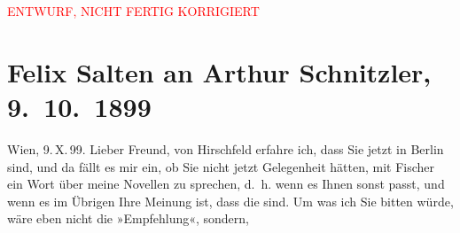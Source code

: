 
\begin{center}
            \textcolor{red}{ENTWURF, NICHT FERTIG KORRIGIERT}
                      \end{center}
            
         
         \renewcommand{\erwaehntePersonen}{Personen: Samuel Fischer, Georg Hirschfeld}
         \renewcommand{\erwaehnteInstitutionen}{Institutionen: S. Fischer Verlag, Volkstheater}
         \renewcommand{\erwaehnteOrte}{Orte: Berlin, Wien}
         \renewcommand{\erwaehnteWerke}{Werke: Der Hinterbliebene. Kurze Novellen, Schöne Seelen. Komödie in einem Akt}
               \section[Felix Salten an Arthur Schnitzler, 9. 10. 1899]{ Felix Salten an Arthur Schnitzler, 9. 10. 1899}\nopagebreak{}\rehead{ }\begin{ledgroupsized}[t]{13cm}\normalsize\beginnumbering \toendnotes[C]{\smallbreak\pagebreak[2]} 
\toendnotes[C]{\smallbreak}\pstart
           \raggedleft{}{\pb}Wien, 9. X. 99. \pend
           \pstart
           Lieber Freund, von Hirschfeld
               erfahre ich, dass Sie jetzt in Berlin sind, und
               da fällt es mir ein, ob Sie nicht jetzt Gelegenheit hätten, mit Fischer ein Wort über meine Novellen zu sprechen, d. h. wenn es Ihnen sonst passt, und
               wenn es im Übrigen Ihre Meinung ist, dass die \label{K_L03301-1v}\label{K_L03301-1h} sind. Um was ich Sie bitten würde, wäre eben nicht die »Empfehlung«, sondern,

\end{ledgroupsized}

